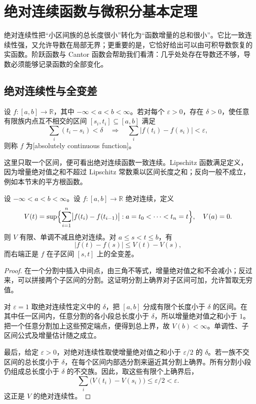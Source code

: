 \section{绝对连续函数与微积分基本定理}
\label{b1:sec:1604}

绝对连续性把“小区间族的总长度很小”转化为“函数增量的总和很小”。它比一致连续性强，又允许导数在局部无界；更重要的是，它恰好给出可以由可积导数恢复的实函数。阶跃函数与 Cantor 函数会帮助我们看清：几乎处处存在导数还不够，导数必须能够记录函数的全部变化。


\subsection{绝对连续性与全变差}
\label{b1:subsec:160401}

\begin{definition}
\label{b1:def:absolutely-continuous-function}
设 \(f:[a,b]\to\mathbb R\)，其中 \(-\infty<a<b<\infty\)。若对每个 \(\varepsilon>0\)，存在 \(\delta>0\)，使任意有限族内点互不相交的区间 \([s_i,t_i]\subseteq[a,b]\) 满足
\[
\sum_i(t_i-s_i)<\delta
\quad\Longrightarrow\quad
\sum_i\bigl|f(t_i)-f(s_i)\bigr|<\varepsilon,
\]
则称 \(f\) 为[absolutely continuous function]。
\end{definition}

这里只取一个区间，便可看出绝对连续函数一致连续。Lipschitz 函数满足定义，因为增量绝对值之和不超过 Lipschitz 常数乘以区间长度之和；反向一般不成立，例如本节末的平方根函数。

\begin{lemma}
\label{b1:lem:ac-real-variation}
设 \(-\infty<a<b<\infty\)。设 \(f:[a,b]\to\mathbb R\) 绝对连续，定义
\[
V(t)=\sup\Bigl\{\sum_{i=1}^n
  \bigl|f(t_i)-f(t_{i-1})\bigr|:
a=t_0<\cdots<t_n=t\Bigr\},
\quad V(a)=0.
\]
则 \(V\) 有限、单调不减且绝对连续。对 \(a\leq s<t\leq b\)，有
\[
\bigl|f(t)-f(s)\bigr|\leq V(t)-V(s),
\]
而右端正是 \(f\) 在子区间 \([s,t]\) 上的全变差。
\end{lemma}
\begin{proof}
在一个分割中插入中间点，由三角不等式，增量绝对值之和不会减小；反过来，可以拼接两个子区间的分割。这证明分割上确界对子区间可加，允许暂取无穷值。

对 \(\varepsilon=1\) 取绝对连续性定义中的 \(\delta\)，把 \([a,b]\) 分成有限个长度小于 \(\delta\) 的区间。在其中任一区间内，任意分割的各小段总长度小于 \(\delta\)，所以增量绝对值之和小于 \(1\)。把一个任意分割加上这些预定端点，便得到总上界，故 \(V(b)<\infty\)。单调性、子区间公式及增量估计随之成立。

最后，给定 \(\varepsilon>0\)，对绝对连续性取使增量绝对值之和小于 \(\varepsilon/2\) 的 \(\delta\)。若一族不交区间的总长度小于 \(\delta\)，在每个区间内部选分割来逼近其分割上确界。所有分割小段仍组成总长度小于 \(\delta\) 的不交族。因此，取这些有限个上确界后，
\[
\sum_i\bigl(V(t_i)-V(s_i)\bigr)\leq\varepsilon/2<\varepsilon.
\]
这正是 \(V\) 的绝对连续性。
\end{proof}

